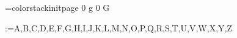 \def\koenum#1{\ifcase#1 (???)\or%
(가)\or(나)\or(다)\or(라)\or(마)\or(바)\or(사)\or(아)\or%
(자)\or(차)\or(카)\or(타)\or(파)\or(하)\else(???)\fi\enskip\ignorespaces}

\protected{}
\def\pdfcolorstackinit{\pdffeedback colorstackinit}
\mathchardef{}=\pdfcolorstackinit page {0 g 0 G}
\def\colorpop{\pdfcolorstack\colorcnt pop}
\def\colorpush#1{\pdfcolorstack\colorcnt push {#1 k #1 K}}
\def\colorset#1{\pdfcolorstack\colorcnt set {#1 k #1 K}}
\def\answercolor{\colorpush{0 1 1 0}\aftergroup\colorpop}
\def\answer#1{\ifanswershown\par\null\hfill{\answercolor\bf Ans : #1}\fi}

\def\fr#1{\begingroup
\setbox0=\hbox{#1}
\advance\dimen0 by \ht0
\advance\dimen0 by .6pt
\ooalign{\raise\dimen0\hbox to\wd0{\hss$\mathchar"0B0F$\hss}\cr$#1$\cr}
\endgroup}
\let\emptyset\varnothing

\def\ALPHABETList{A,B,C,D,E,F,G,H,I,J,K,L,M,N,O,P,Q,R,S,T,U,V,W,X,Y,Z}
\for\ALPHABET:=\ALPHABETList\do{%
    \expandafter\xdef\csname\ALPHABET f\endcsname{{\frak\ALPHABET}}
    \expandafter\xdef\csname\ALPHABET c\endcsname{{\cal\ALPHABET}}
    \expandafter\xdef\csname\ALPHABET b\endcsname{{\bbb\ALPHABET}}
    \expandafter\xdef\csname\ALPHABET s\endcsname{{\scr\ALPHABET}}
}
\let\N=\Nb \let\Z=\Zb \let\Q=\Qb \let\R=\Rb \let\C=\Cb

\newif\iftwocols

\twocolstrue

\let\onecol\twocolsfalse
\let\twocol\twocolstrue
\let\twocols\twocolstrue

\outer\def\loadexam{%
}

